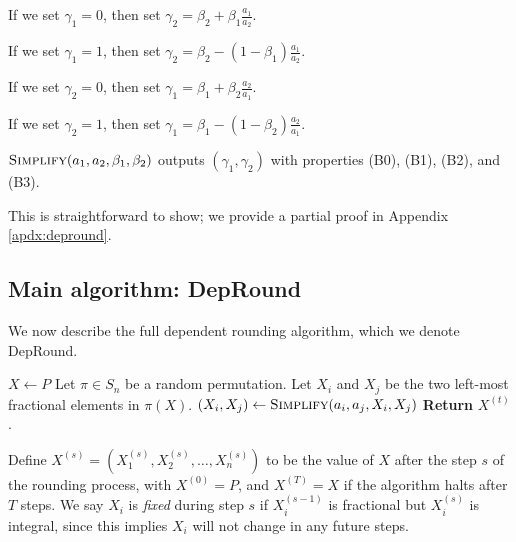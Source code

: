 If we set $\gamma_1=0$, then set $\gamma_2=\beta_2+\beta_1\frac{a_1}{a_2}$.

If we set $\gamma_1=1$, then set $\gamma_2=\beta_2-(1-\beta_1)\frac{a_1}{a_2}$.

If we set $\gamma_2=0$, then set $\gamma_1=\beta_1+\beta_2\frac{a_2}{a_1}$.

If we set $\gamma_2=1$, then set $\gamma_1=\beta_1-(1-\beta_2)\frac{a_2}{a_1}$.

\begin{lemma}\label{lemma:b-props}
$\textsc{Simplify}(a_1,a_2,\beta_1,\beta_2)$ outputs $(\gamma_1,\gamma_2)$ with properties (B0), (B1), (B2), and (B3).
\end{lemma}
This is straightforward to show; we provide a partial proof in Appendix \ref{apdx:depround}.

\subsection{Main algorithm: {\sc DepRound}} \label{sec:depround}
We now describe the full dependent rounding algorithm, which we denote {\sc DepRound}. 


\begin{algorithm}[h]
\caption{$\textsc{DepRound}(P,A)$}
\begin{algorithmic}[1]
\STATE $X\gets P$
\STATE Let $\pi\in S_n$ be a random permutation.
\STATE Let $X_i$ and $X_j$ be the two left-most fractional elements in $\pi(X)$.\label{step:pick_ij}
\STATE $(X_i, X_j)\gets \textsc{Simplify}(a_i,a_j,X_i,X_j)$
\ENDWHILE
\STATE \textbf{Return} $X^{(t)}$.
\end{algorithmic} 
\label{algo:A}
\end{algorithm}
Define $X^{(s)}=(X^{(s)}_1,X^{(s)}_2,\ldots,X^{(s)}_n)$ to be the value of $X$ after the step $s$ of the rounding process, with $X^{(0)}=P$, and $X^{(T)}=X$ if the algorithm halts after $T$ steps. 
We say $X_i$ is \emph{fixed} during step $s$ if $X_i^{(s-1)}$ is fractional but $X_i^{(s)}$ is integral, since this implies $X_i$ will not change in any future steps.

